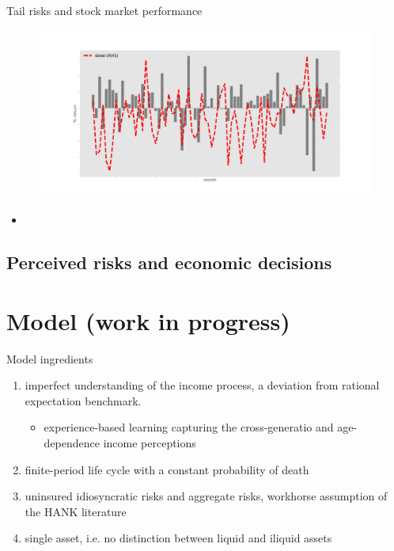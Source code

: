 \documentclass{beamer}
\begin{document}
\begin{frame}{Tail risks and stock market performance}
	\begin{figure}
		\centering
		\label{ts_skew}
		\includegraphics[width=\textwidth]{figures/tsEstMeanskew.jpg}
	\end{figure}
	\begin{itemize}
		\item 
	\end{itemize}
\end{frame}

\subsection{Perceived risks and economic decisions}

\section{Model (work in progress)}

\begin{frame}{Model ingredients}
	
	\begin{enumerate}
		\item imperfect understanding of the income process, a deviation from rational expectation benchmark. 
		\begin{itemize}
			\item experience-based learning capturing the cross-generatio and age-dependence income perceptions
		\end{itemize}
		\item finite-period life cycle with a constant probability of death 
		\item uninsured idiosyncratic risks and aggregate risks, workhorse assumption of the HANK literature
		\item single asset, i.e. no distinction between liquid and iliquid assets 
	\end{enumerate}
\end{frame}
\end{document}

